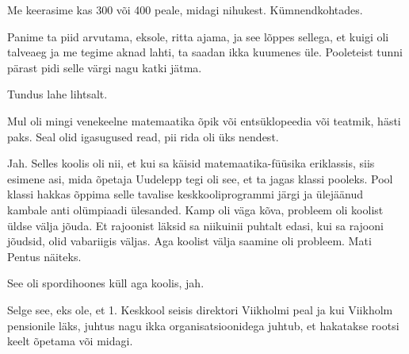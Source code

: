 
Me keerasime kas 300 või 400 peale, midagi nihukest. Kümnendkohtades.

Panime ta piid arvutama, eksole, ritta ajama, ja see lõppes sellega, et 
kuigi oli talveaeg ja me tegime aknad lahti, ta saadan ikka kuumenes üle. 
Pooleteist tunni pärast pidi selle värgi nagu katki jätma.
                 

Tundus lahe lihtsalt.

                 
Mul oli mingi venekeelne matemaatika õpik või  
entsüklopeedia või teatmik, hästi paks. Seal olid igasugused read, pii rida oli 
üks nendest.


Jah. Selles koolis oli nii, et kui sa käisid 
matemaatika-füüsika eriklassis, siis esimene asi, mida õpetaja 
Uudelepp tegi oli see, et 
ta jagas klassi pooleks. Pool klassi hakkas õppima selle tavalise 
keskkooliprogrammi järgi ja ülejäänud kambale anti olümpiaadi ülesanded. Kamp oli 
väga kõva, probleem oli koolist üldse välja jõuda. Et rajoonist läksid sa 
niikuinii puhtalt edasi, kui sa rajooni jõudsid, olid vabariigis 
väljas. Aga koolist välja saamine oli probleem. Mati 
Pentus näiteks. 
               

See oli spordihoones küll aga koolis, jah. 


Selge see, eks ole, et 1. Keskkool seisis direktori Viikholmi peal ja kui 
Viikholm pensionile läks,  juhtus nagu ikka organisatsioonidega juhtub, et 
hakatakse rootsi keelt õpetama või midagi.

